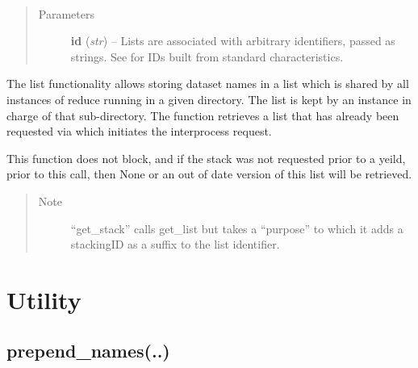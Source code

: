 \documentclass[letterpaper,10pt,english]{sphinxmanual}
\begin{document}
\begin{fulllineitems}
\label{chapter_ReductionContextClass:astrodata.RecipeManager.ReductionContext.get_list}~\begin{quote}\begin{description}
\item[{Parameters}] \leavevmode
\textbf{id} (\emph{str}) -- Lists are associated with arbitrary identifiers,
passed as strings.  See  for IDs built from
standard  characteristics.

\end{description}\end{quote}

The list functionality allows storing dataset names in a list
which is shared by all instances of reduce running in a given
directory.  The list is kept by an  instance in charge of that
sub-directory.  The  function retrieves a list that has
already been requested via  which initiates the
interprocess request.

This function does not block, and if the stack was not requested
prior to a yeild, prior to this call, then None or an out of date
version of this list will be retrieved.
\begin{quote}\begin{description}
\item[{Note }] \leavevmode
``get\_stack'' calls get\_list but takes a ``purpose'' to which it adds
a stackingID as a suffix to the list identifier.

\end{description}\end{quote}

\end{fulllineitems}



\section{Utility}
\label{chapter_ReductionContextClass:utility}

\subsection{prepend\_names(..)}
\label{chapter_ReductionContextClass:prepend-names}
\end{document}
